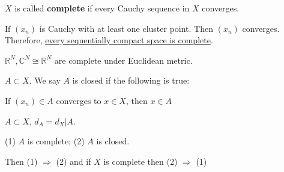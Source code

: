 \begin{definition}
     $ X  $ is called \textbf{complete} if every Cauchy sequence in  $ X  $ converges.
\end{definition}
\begin{theorem}
    If  $ (x_n ) $ is Cauchy with at least one cluster point. Then  $ (x_n ) $ converges. Therefore, \underline{every sequentially compact space is complete}.
\end{theorem}
\begin{corollary}
     $ \mathbb{R}^N,\mathbb{C}^N\cong \mathbb{R}^N $ are complete under Euclidean metric.
\end{corollary}
\begin{definition}
     $ A\subset X  $. We say  $ A  $ is closed if the following is true:
     \begin{center}
        If  $ (x_n)\in A  $ converges to  $ x\in X  $, then  $ x\in A  $ 
     \end{center}
\end{definition}
\begin{proposition}
     $ A\subset X  $,  $ d_A=d_X|A $. 
     \begin{center}
        (1)  $ A  $ is complete; (2) $  A  $ is closed. 
     \end{center}
     Then (1) $ \Rightarrow $  (2) and if  $ X  $ is complete then (2) $ \Rightarrow $  (1)
\end{proposition}
